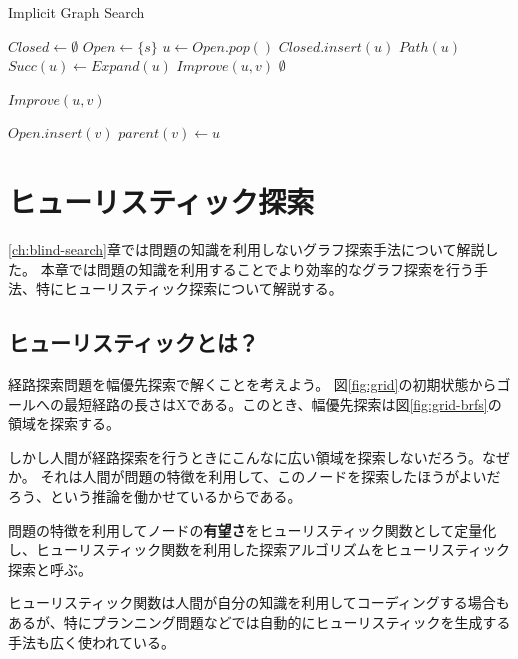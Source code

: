 \documentclass{report}
\begin{document}
\begin{algorithm}
\caption{Implicit Graph Search}
\label{alg:implicit-graph-search}
	$Closed \leftarrow \emptyset$\;
	$Open \leftarrow \{s\}$\;
	 {
		$u \leftarrow Open.pop()$\;
		$Closed.insert(u)$\;
		 {
			\Return $Path(u)$\;
		}
		$Succ(u) \leftarrow Expand(u)$\;
		 {
			$Improve(u, v)$\;
		}
 	}
	\Return $\emptyset$\;
\end{algorithm}

\begin{algorithm}
\caption{$Improve(u,v)$}
\label{alg:improve}
	 {
		$Open.insert(v)$\;
		$parent(v) \leftarrow u$\;
	}
\end{algorithm}


\chapter{ヒューリスティック探索}
\label{ch:heuristic-search}

\ref{ch:blind-search}章では問題の知識を利用しないグラフ探索手法について解説した。
本章では問題の知識を利用することでより効率的なグラフ探索を行う手法、特にヒューリスティック探索について解説する。

\section{ヒューリスティックとは？}
\label{sec:heursitic}

経路探索問題を幅優先探索で解くことを考えよう。
図\ref{fig:grid}の初期状態からゴールへの最短経路の長さはXである。このとき、幅優先探索は図\ref{fig:grid-brfs}の領域を探索する。

しかし人間が経路探索を行うときにこんなに広い領域を探索しないだろう。なぜか。
それは人間が問題の特徴を利用して、このノードを探索したほうがよいだろう、という推論を働かせているからである。

問題の特徴を利用してノードの{\bf 有望さ}をヒューリスティック関数として定量化し、ヒューリスティック関数を利用した探索アルゴリズムをヒューリスティック探索と呼ぶ。

ヒューリスティック関数は人間が自分の知識を利用してコーディングする場合もあるが、特にプランニング問題などでは自動的にヒューリスティックを生成する手法も広く使われている。
\end{document}
